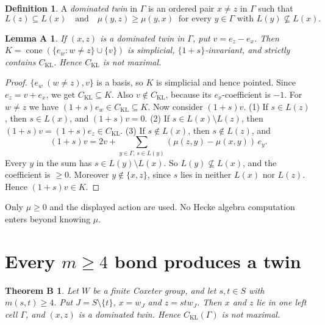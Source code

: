 \documentclass[11pt]{amsart}
\newtheorem*{lemmaA}{Lemma A}
\newtheorem*{theoremB}{Theorem B}
\theoremstyle{definition}
\newtheorem{definition}[theorem]{Definition}
\theoremstyle{remark}
\newcommand{\CKL}{C_{\mathrm{KL}}}
\begin{document}
\begin{definition}
A \emph{dominated twin} in $\Gamma$ is an ordered pair $x\ne z$ in $\Gamma$ such that
\[L(z)\subseteq L(x)\quad\text{and}\quad \mu(y,z)\ge\mu(y,x)\ \text{ for every } y\in\Gamma \text{ with } L(y)\not\subseteq L(x).\]
\end{definition}

\begin{lemmaA}
If $(x,z)$ is a dominated twin in $\Gamma$, put $v=e_z-e_x$. Then $K=\operatorname{cone}(\{e_w:w\ne z\}\cup\{v\})$ is simplicial, $\{1+s\}$-invariant, and strictly contains $\CKL$. Hence $\CKL$ is not maximal.
\end{lemmaA}

\begin{proof}
$\{e_w\ (w\ne z),v\}$ is a basis, so $K$ is simplicial and hence pointed. Since $e_z=v+e_x$, we get $\CKL\subseteq K$. Also $v\notin\CKL$, because its $e_x$-coefficient is $-1$. For $w\ne z$ we have $(1+s)e_w\in\CKL\subseteq K$. Now consider $(1+s)v$.
(1) If $s\in L(z)$, then $s\in L(x)$, and $(1+s)v=0$.
(2) If $s\in L(x)\setminus L(z)$, then $(1+s)v=(1+s)e_z\in\CKL$.
(3) If $s\notin L(x)$, then $s\notin L(z)$, and
\[(1+s)v=2v+\textstyle\sum_{y\in\Gamma,\,s\in L(y)}(\mu(z,y)-\mu(x,y))\,e_y .\]
Every $y$ in the sum has $s\in L(y)\setminus L(x)$. So $L(y)\not\subseteq L(x)$, and the coefficient is $\ge0$. Moreover $y\notin\{x,z\}$, since $s$ lies in neither $L(x)$ nor $L(z)$. Hence $(1+s)v\in K$.
\end{proof}

Only $\mu\ge0$ and the displayed action are used. No Hecke algebra computation enters beyond knowing $\mu$.

\section{Every \texorpdfstring{$m\ge4$}{m>=4} bond produces a twin}

\begin{theoremB}
Let $W$ be a finite Coxeter group, and let $s,t\in S$ with $m(s,t)\ge4$. Put $J=S\setminus\{t\}$, $x=w_J$ and $z=stw_J$. Then $x$ and $z$ lie in one left cell $\Gamma$, and $(x,z)$ is a dominated twin. Hence $\CKL(\Gamma)$ is not maximal.
\end{theoremB}
\end{document}
